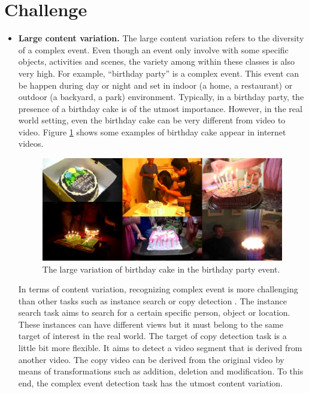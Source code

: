 \section{Challenge}
\label{c1_challenges}
\begin{itemize}
	\item{\textbf{Large content variation.}} The large content variation refers to the diversity of a complex event. Even though an event only involve with some specific objects, activities and scenes, the variety among within these classes is also very high. For example, ``birthday party'' is a complex event. This event can be happen during day or night and set in indoor (a home, a restaurant) or outdoor (a backyard, a park) environment. Typically, in a birthday party, the presence of a birthday cake is of the utmost importance. However, in the real world setting, even the birthday cake can be very different from video to video. Figure \ref{c1_largecontent} shows some examples of birthday cake appear in internet videos. 
	\begin{figure}
		\centering
		\includegraphics[width=1\textwidth]{largecontent.png}
		\caption{The large variation of birthday cake in the birthday party event.}
		\label{c1_largecontent}
	\end{figure}
	
	In terms of content variation, recognizing complex event is more challenging than other tasks such as instance search  or copy detection . The instance search task aims to search for a certain specific person, object or location. These instances can have different views but it must belong to the same target of interest in the real world. The target of copy detection task is a little bit more flexible. It aims to detect a video segment that is derived from another video. The copy video can be derived from the original video by means of transformations such as addition, deletion and modification. To this end, the complex event detection task has the utmost content variation.
	 

\end{itemize}
